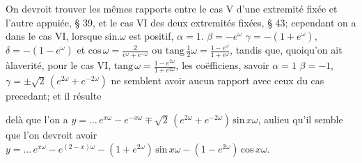 \documentclass[11pt,a4paper]{article}
\begin{document}
On devroit trouver les mêmes rapports entre le cas V d'une extremité fixée
et l'autre appuiée, § 39, et le cas VI des deux extremités fixées, § 43; cependant
on a dans le cas VI, lorsque sin.$\omega$ est positif, $\alpha = 1$. $\beta = -e^{\omega}$ $\gamma = -(1 + e^{\omega})$, $\delta = -(1 - e^{\omega})$
et $\text{cos}\,\omega = \frac{2}{e^{\omega} + e^{-\omega}}$ ou $\text{tang}\,\frac{1}{2}\omega = \frac{1 - e^{\omega}}{1 + e^{\omega}}$, tandis que, quoiqu'on ait àlaverité,
pour le cas VI, $\text{tang}\,\omega = \frac{1 - e^{2\omega}}{1 + e^{2\omega}}$, les coëfficiens, savoir $\alpha = 1$ $\beta = -1$, $\gamma = \pm\sqrt{2}\,(e^{2\omega} + e^{-2\omega})$
ne semblent avoir aucun rapport avec ceux du cas precedant; et il résulte


delà que l'on a $y = \ldots\, e^{x\omega} - e^{-x\omega} \mp \sqrt{2}\,(e^{2\omega} + e^{-2\omega})\,\text{sin}\,x\omega$, aulieu qu'il semble que
l'on devroit avoir $y = \ldots\, e^{x\omega} - e^{(2-x)\omega} - (1 + e^{2\omega})\,\text{sin}\,x\omega - (1 - e^{2\omega})\,\text{cos}\,x\omega$.
\end{document}
